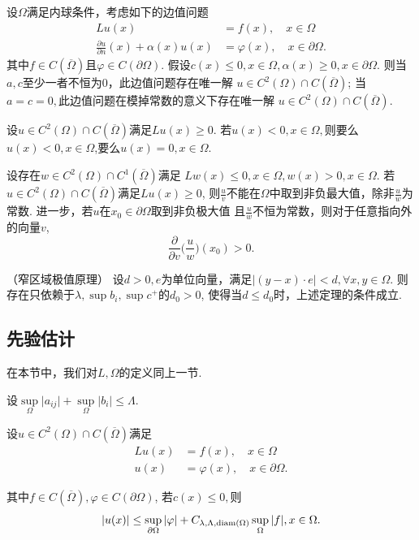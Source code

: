 \begin{proposition}
    设$\Omega$满足内球条件，考虑如下的边值问题
 \begin{align*}
    Lu(x)&=f(x),\quad x\in \Omega\\
    \frac{\partial u}{\partial n}(x)+\alpha (x)u(x) &=\varphi(x),\quad x\in \partial \Omega.
 \end{align*} 
其中$f\in C(\overline{\Omega})$且$\varphi\in C(\partial \Omega)$.
假设$c(x)\leq 0,x\in \Omega,\alpha (x)\geq 0,x\in \partial \Omega$.
则当$a,c$至少一者不恒为$0$，此边值问题存在唯一解
$u\in C^2(\Omega)\cap C(\overline{\Omega})$;
当$a=c=0,$此边值问题在模掉常数的意义下存在唯一解
$u\in C^2(\Omega)\cap C(\overline{\Omega})$.
\end{proposition} 

\begin{theorem}
    设$u\in C^2(\Omega)\cap C(\overline{\Omega})$满足$Lu(x)\geq 0$.
    若$u(x)<0,x\in \Omega,$则要么$u(x)<0,x\in \Omega$,要么$u(x)=0,x\in \Omega.$
\end{theorem}
\begin{proposition}
    设存在$w\in C^2(\Omega)\cap C^1(\overline{\Omega})$满足
    $Lw(x)\leq 0,x\in \Omega,w(x)>0,x\in \Omega$.
    若$u\in C^2(\Omega)\cap C(\overline{\Omega})$满足$Lu(x)\geq 0$,
    则$\frac{u}{v}$不能在$\Omega$中取到非负最大值，除非$\frac{u}{w}$为常数.
    进一步，若$u$在$x_0\in \partial \Omega$取到非负极大值
    且$\frac{u}{w}$不恒为常数，则对于任意指向外的向量$v$,
    $$\frac{\partial }{\partial v}\Big(\frac{u}{w}\Big)(x_0)>0.$$
\end{proposition} 

\begin{proposition}（窄区域极值原理）
设$d>0,e$为单位向量，满足$\vert (y-x)\cdot e\vert <d,\forall x,y\in \Omega$.
则存在只依赖于$\lambda, \sup b_i,\sup c^+$的$d_0>0$,
使得当$d\leq d_0$时，上述定理的条件成立.
\end{proposition}

\subsection{先验估计}
在本节中，我们对$L,\Omega$的定义同上一节.

设$\sup\limits_{\Omega}\vert a_{ij}\vert
+\sup\limits_{\Omega}\vert b_i\vert \leq \Lambda$.

\begin{proposition}
    设$u\in C^2(\Omega)\cap C(\overline{\Omega})$满足
\begin{align*}
    Lu(x)&=f(x),\quad x\in \Omega\\
    u(x) &=\varphi(x),\quad x\in \partial \Omega.
 \end{align*} 

其中$f\in C(\overline{\Omega }),\varphi \in C(\partial \Omega)$,
若$c(x)\leq 0,$则 
$$ \vert u(x)\vert \leq \sup_{\partial \Omega}\vert \varphi\vert 
+C_{\lambda,\Lambda,\operatorname{diam}(\Omega)}\sup_{\Omega}\vert f\vert ,x\in\Omega.$$
\end{proposition} 

